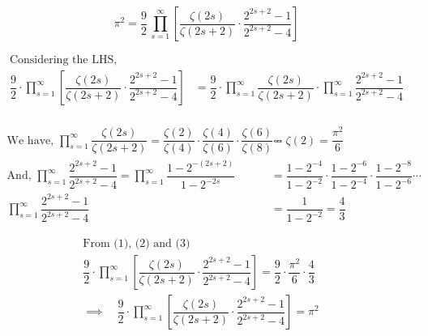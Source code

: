 \documentclass[12pt, a4paper]{article}
\begin{document}
\[
    \pi^2 = \dfrac{9}{2} \, \prod_{s=1}^{\infty} \left[\dfrac{\zeta(2s)}{\zeta(2s+2)} \cdot \dfrac{2^{2s+2}-1}{2^{2s+2}-4}\right]
\]

\begin{align*}
    \text{Considering the LHS, } \\
    \dfrac{9}{2} \cdot \prod_{s=1}^{\infty} \left[ \dfrac{\zeta(2s)}{\zeta(2s+2)} \cdot \dfrac{2^{2s+2}-1}{2^{2s+2}-4} \right] &= 
    \dfrac{9}{2} \cdot \prod_{s=1}^{\infty} \dfrac{\zeta(2s)}{\zeta(2s+2)} \cdot \prod_{s=1}^{\infty} \dfrac{2^{2s+2}-1}{2^{2s+2}-4} \tag{1} \\
\end{align*}

\begin{align*}
    \text{We have, }
    \prod_{s=1}^{\infty} \dfrac{\zeta(2s)}{\zeta(2s+2)} = \dfrac{\zeta(2)}{\zeta(4)} \cdot \dfrac{\zeta(4)}{\zeta(6)} \cdot \dfrac{\zeta(6)}{\zeta(8)} \cdots &= 
    \zeta(2) = \dfrac{\pi^2}{6} \tag{2} \\
    \text{And, }
    \prod_{s=1}^{\infty} \dfrac{2^{2s+2}-1}{2^{2s+2}-4} = \prod_{s=1}^{\infty} \dfrac{1-2^{-(2s+2)}}{1-2^{-2s}} &=
    \dfrac{1-2^{-4}}{1-2^{-2}} \cdot \dfrac{1-2^{-6}}{1-2^{-4}} \cdot \dfrac{1-2^{-8}}{1-2^{-6}} \cdots \\
    \prod_{s=1}^{\infty} \dfrac{2^{2s+2}-1}{2^{2s+2}-4} &= \dfrac{1}{1-2^{-2}} = \dfrac{4}{3} \tag{3}
\end{align*}

\begin{align*}
    \text{From (1), (2) and (3)} \\
    \dfrac{9}{2} \cdot \prod_{s=1}^{\infty} \left[ \dfrac{\zeta(2s)}{\zeta(2s+2)} \cdot \dfrac{2^{2s+2}-1}{2^{2s+2}-4} \right] = 
    \dfrac{9}{2} \cdot \dfrac{\pi^2}{6} \cdot \dfrac{4}{3} \\
    \implies \boxed{\quad \dfrac{9}{2} \cdot \prod_{s=1}^{\infty} \left[ \dfrac{\zeta(2s)}{\zeta(2s+2)} \cdot \dfrac{2^{2s+2}-1}{2^{2s+2}-4} \right] = \pi^2 \quad}
\end{align*}
\end{document}
